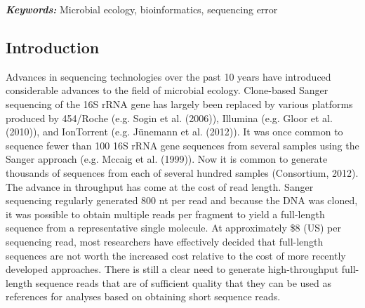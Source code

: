 \documentclass[11pt,]{article}
\begin{document}
\textbf{\emph{Keywords:}} Microbial ecology, bioinformatics, sequencing
error

\newpage

\subsection{Introduction}\label{introduction}

Advances in sequencing technologies over the past 10 years have
introduced considerable advances to the field of microbial ecology.
Clone-based Sanger sequencing of the 16S rRNA gene has largely been
replaced by various platforms produced by 454/Roche (e.g. Sogin et al.
(2006)), Illumina (e.g. Gloor et al. (2010)), and IonTorrent (e.g.
Jünemann et al. (2012)). It was once common to sequence fewer than 100
16S rRNA gene sequences from several samples using the Sanger approach
(e.g. Mccaig et al. (1999)). Now it is common to generate thousands of
sequences from each of several hundred samples (Consortium, 2012). The
advance in throughput has come at the cost of read length. Sanger
sequencing regularly generated 800 nt per read and because the DNA was
cloned, it was possible to obtain multiple reads per fragment to yield a
full-length sequence from a representative single molecule. At
approximately \$8 (US) per sequencing read, most researchers have
effectively decided that full-length sequences are not worth the
increased cost relative to the cost of more recently developed
approaches. There is still a clear need to generate high-throughput
full-length sequence reads that are of sufficient quality that they can
be used as references for analyses based on obtaining short sequence
reads.
\end{document}

